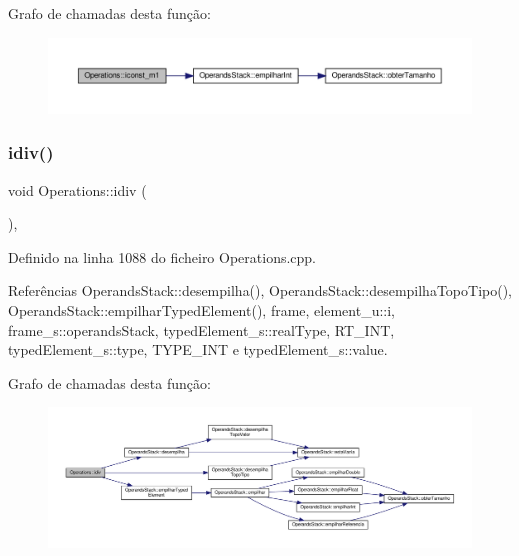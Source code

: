 Grafo de chamadas desta função\+:
\nopagebreak
\begin{figure}[H]
\begin{center}
\leavevmode
\includegraphics[width=350pt]{classOperations_abb57552d42047d4b685b2d68db6b1fd7_cgraph}
\end{center}
\end{figure}
\mbox{\label{classOperations_a5bf24c3cc02a8282c21a37cd7b7ba5d3}} 
\subsubsection{\texorpdfstring{idiv()}{idiv()}}
{\footnotesize\ttfamily void Operations\+::idiv (\begin{DoxyParamCaption}{ }\end{DoxyParamCaption})\hspace{0.3cm}{\ttfamily [static]}, {\ttfamily [private]}}



Definido na linha 1088 do ficheiro Operations.\+cpp.



Referências Operands\+Stack\+::desempilha(), Operands\+Stack\+::desempilha\+Topo\+Tipo(), Operands\+Stack\+::empilhar\+Typed\+Element(), frame, element\+\_\+u\+::i, frame\+\_\+s\+::operands\+Stack, typed\+Element\+\_\+s\+::real\+Type, R\+T\+\_\+\+I\+NT, typed\+Element\+\_\+s\+::type, T\+Y\+P\+E\+\_\+\+I\+NT e typed\+Element\+\_\+s\+::value.

Grafo de chamadas desta função\+:
\nopagebreak
\begin{figure}[H]
\begin{center}
\leavevmode
\includegraphics[width=350pt]{classOperations_a5bf24c3cc02a8282c21a37cd7b7ba5d3_cgraph}
\end{center}
\end{figure}
\mbox{\label{classOperations_aa0432645b0d0effb4d4d839ea2dcec1c}} 
